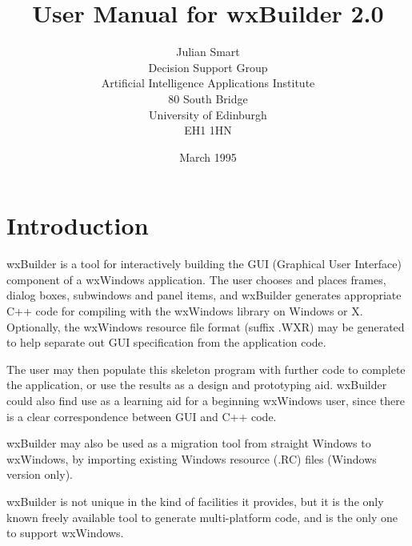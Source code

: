 %
\parindent 0pt
\parskip 11pt

\title{User Manual for wxBuilder 2.0}
\author{Julian Smart\\Decision Support Group\\Artificial Intelligence Applications Institute\\80 South Bridge\\University of Edinburgh\\EH1 1HN}
\date{March 1995}
\makeindex

\maketitle

\pagestyle{fancyplain}

\setfooter{\thepage}{}{}{}{}{\thepage}
\tableofcontents%

\chapter{Introduction}%
%
%
\setfooter{\thepage}{}{}{}{}{\thepage}%

wxBuilder is a tool for interactively building the GUI (Graphical User
Interface) component of a wxWindows application. The user chooses and
places frames, dialog boxes, subwindows and panel items, and wxBuilder
generates appropriate C++ code for compiling with the wxWindows library
on Windows or X. Optionally, the wxWindows resource file format (suffix .WXR)
may be generated to help separate out GUI specification from the application
code.

The user may then populate this skeleton program with further code to
complete the application, or use the results as a design and prototyping
aid. wxBuilder could also find use as a learning aid for a beginning
wxWindows user, since there is a clear correspondence between GUI and
C++ code.

wxBuilder may also be used as a migration tool from straight Windows to
wxWindows, by importing existing Windows resource (.RC) files (Windows version
only).

wxBuilder is not unique in the kind of facilities it provides, but it is
the only known freely available tool to generate multi-platform code,
and is the only one to support wxWindows.

